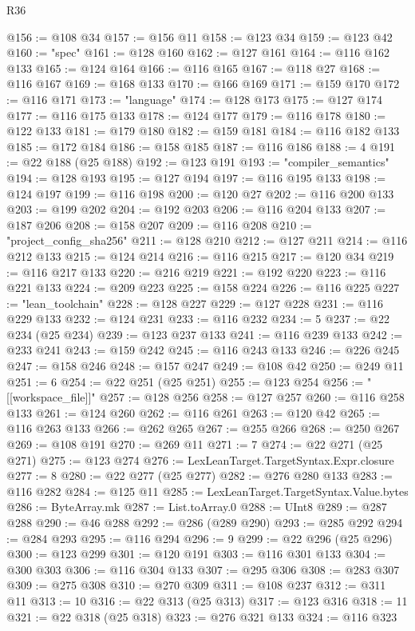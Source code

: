 \begin{lexlean}{R36}
\begin{coremodule}
@156 := @108 @34
@157 := @156 @11
@158 := @123 @34
@159 := @123 @42
@160 := "spec"
@161 := @128 @160
@162 := @127 @161
@164 := @116 @162 @133
@165 := @124 @164
@166 := @116 @165
@167 := @118 @27
@168 := @116 @167
@169 := @168 @133
@170 := @166 @169
@171 := @159 @170
@172 := @116 @171
@173 := "language"
@174 := @128 @173
@175 := @127 @174
@177 := @116 @175 @133
@178 := @124 @177
@179 := @116 @178
@180 := @122 @133
@181 := @179 @180
@182 := @159 @181
@184 := @116 @182 @133
@185 := @172 @184
@186 := @158 @185
@187 := @116 @186
@188 := 4
@191 := @22 @188 (@25 @188)
@192 := @123 @191
@193 := "compiler_semantics"
@194 := @128 @193
@195 := @127 @194
@197 := @116 @195 @133
@198 := @124 @197
@199 := @116 @198
@200 := @120 @27
@202 := @116 @200 @133
@203 := @199 @202
@204 := @192 @203
@206 := @116 @204 @133
@207 := @187 @206
@208 := @158 @207
@209 := @116 @208
@210 := "project_config_sha256"
@211 := @128 @210
@212 := @127 @211
@214 := @116 @212 @133
@215 := @124 @214
@216 := @116 @215
@217 := @120 @34
@219 := @116 @217 @133
@220 := @216 @219
@221 := @192 @220
@223 := @116 @221 @133
@224 := @209 @223
@225 := @158 @224
@226 := @116 @225
@227 := "lean_toolchain"
@228 := @128 @227
@229 := @127 @228
@231 := @116 @229 @133
@232 := @124 @231
@233 := @116 @232
@234 := 5
@237 := @22 @234 (@25 @234)
@239 := @123 @237 @133
@241 := @116 @239 @133
@242 := @233 @241
@243 := @159 @242
@245 := @116 @243 @133
@246 := @226 @245
@247 := @158 @246
@248 := @157 @247
@249 := @108 @42
@250 := @249 @11
@251 := 6
@254 := @22 @251 (@25 @251)
@255 := @123 @254
@256 := "[[workspace_file]]"
@257 := @128 @256
@258 := @127 @257
@260 := @116 @258 @133
@261 := @124 @260
@262 := @116 @261
@263 := @120 @42
@265 := @116 @263 @133
@266 := @262 @265
@267 := @255 @266
@268 := @250 @267
@269 := @108 @191
@270 := @269 @11
@271 := 7
@274 := @22 @271 (@25 @271)
@275 := @123 @274
@276 := LexLeanTarget.TargetSyntax.Expr.closure
@277 := 8
@280 := @22 @277 (@25 @277)
@282 := @276 @280 @133
@283 := @116 @282
@284 := @125 @11
@285 := LexLeanTarget.TargetSyntax.Value.bytes
@286 := ByteArray.mk
@287 := List.toArray.{0}
@288 := UInt8
@289 := @287 @288
@290 := @46 @288
@292 := @286 (@289 @290)
@293 := @285 @292
@294 := @284 @293
@295 := @116 @294
@296 := 9
@299 := @22 @296 (@25 @296)
@300 := @123 @299
@301 := @120 @191
@303 := @116 @301 @133
@304 := @300 @303
@306 := @116 @304 @133
@307 := @295 @306
@308 := @283 @307
@309 := @275 @308
@310 := @270 @309
@311 := @108 @237
@312 := @311 @11
@313 := 10
@316 := @22 @313 (@25 @313)
@317 := @123 @316
@318 := 11
@321 := @22 @318 (@25 @318)
@323 := @276 @321 @133
@324 := @116 @323

\end{coremodule}
\end{lexlean}
